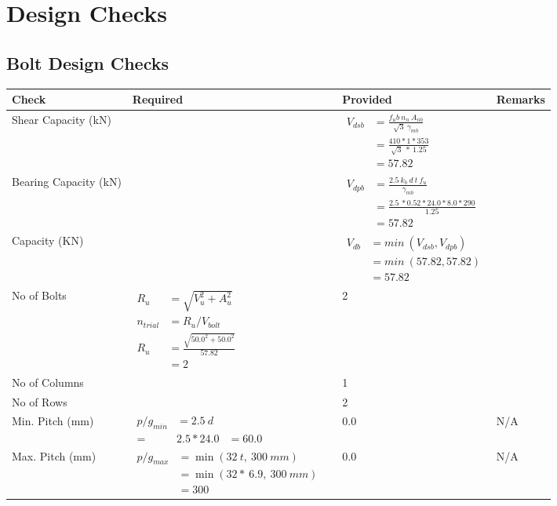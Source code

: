 \documentclass{article}%
\begin{document}
%
%
\section{Design Checks}%
\label{sec:DesignChecks}%
\subsection{Bolt Design Checks}%
\label{subsec:BoltDesignChecks}%
\renewcommand{\arraystretch}{1.2}%
\begin{longtable}{|p{4cm}|p{5cm}|p{5.5cm}|p{1.5cm}|}%
\hline%
\rowcolor{OsdagGreen}%
Check&Required&Provided&Remarks\\%
\hline%
\endhead%
\hline%
Shear Capacity (kN)&&$\begin{aligned}V_{dsb} &= \frac{f_ub ~n_n~ A_{nb}}{\sqrt{3} ~\gamma_{mb}}\\ &= \frac{410*1*353}{\sqrt{3}~*~1.25}\\ &= 57.82\end{aligned}$&\\%
\hline%
Bearing Capacity (kN)&&$\begin{aligned}V_{dpb} &= \frac{2.5~ k_b~ d~ t~ f_u}{\gamma_{mb}}\\ &= \frac{2.5~*0.52*24.0*8.0*290}{1.25}\\ &=57.82\end{aligned}$&\\%
\hline%
Capacity (KN)&&$\begin{aligned}V_{db} &= min~ (V_{dsb}, V_{dpb})\\ &= min~ (57.82,57.82)\\ &=57.82\end{aligned}$&\\%
\hline%
No of Bolts&$\begin{aligned}R_{u} &= \sqrt{V_u^2+A_u^2}\\ n_{trial} &= R_u/ V_{bolt}\\ R_{u} &= \frac{\sqrt{50.0^2+50.0^2}}{57.82}\\ &=2\end{aligned}$&2&\\%
\hline%
No of Columns&&1&\\%
\hline%
No of Rows&&2&\\%
\hline%
Min. Pitch (mm)&$\begin{aligned}p/g_{min}&= 2.5 ~ d&\\ =&2.5*24.0&=60.0\end{aligned}$&0.0&N/A\\%
\hline%
Max. Pitch (mm)&$\begin{aligned}p/g_{max} &=\min(32~t,~300~mm)&\\ &=\min(32 *~6.9,~ 300 ~mm)\\&=300\end{aligned}$&0.0&N/A\\%

\end{longtable}
\end{document}
